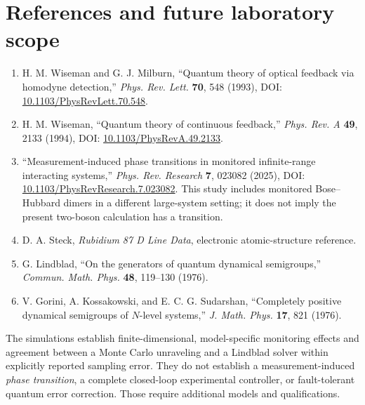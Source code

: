\documentclass[11pt,a4paper]{article}
\begin{document}
\section{References and future laboratory scope}
\begin{enumerate}[leftmargin=*,itemsep=2pt]\small
\item H. M. Wiseman and G. J. Milburn, ``Quantum theory of optical feedback via homodyne detection,'' \emph{Phys. Rev. Lett.} \textbf{70}, 548 (1993), DOI: \href{https://doi.org/10.1103/PhysRevLett.70.548}{10.1103/PhysRevLett.70.548}.
\item H. M. Wiseman, ``Quantum theory of continuous feedback,'' \emph{Phys. Rev. A} \textbf{49}, 2133 (1994), DOI: \href{https://doi.org/10.1103/PhysRevA.49.2133}{10.1103/PhysRevA.49.2133}.
\item ``Measurement-induced phase transitions in monitored infinite-range interacting systems,'' \emph{Phys. Rev. Research} \textbf{7}, 023082 (2025), DOI: \href{https://doi.org/10.1103/PhysRevResearch.7.023082}{10.1103/PhysRevResearch.7.023082}. This study includes monitored Bose--Hubbard dimers in a different large-system setting; it does not imply the present two-boson calculation has a transition.
\item D. A. Steck, \emph{Rubidium 87 D Line Data}, electronic atomic-structure reference.
\item G. Lindblad, ``On the generators of quantum dynamical semigroups,'' \emph{Commun. Math. Phys.} \textbf{48}, 119--130 (1976).
\item V. Gorini, A. Kossakowski, and E. C. G. Sudarshan, ``Completely positive dynamical semigroups of $N$-level systems,'' \emph{J. Math. Phys.} \textbf{17}, 821 (1976).
\end{enumerate}
\begin{remark}
The simulations establish finite-dimensional, model-specific monitoring effects and agreement between a Monte Carlo unraveling and a Lindblad solver within explicitly reported sampling error. They do not establish a measurement-induced \emph{phase transition}, a complete closed-loop experimental controller, or fault-tolerant quantum error correction. Those require additional models and qualifications.
\end{remark}
\end{document}
